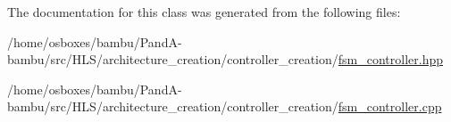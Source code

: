 The documentation for this class was generated from the following files\+:\begin{DoxyCompactItemize}
\item 
/home/osboxes/bambu/\+Pand\+A-\/bambu/src/\+H\+L\+S/architecture\+\_\+creation/controller\+\_\+creation/\hyperlink{fsm__controller_8hpp}{fsm\+\_\+controller.\+hpp}\item 
/home/osboxes/bambu/\+Pand\+A-\/bambu/src/\+H\+L\+S/architecture\+\_\+creation/controller\+\_\+creation/\hyperlink{fsm__controller_8cpp}{fsm\+\_\+controller.\+cpp}\end{DoxyCompactItemize}
